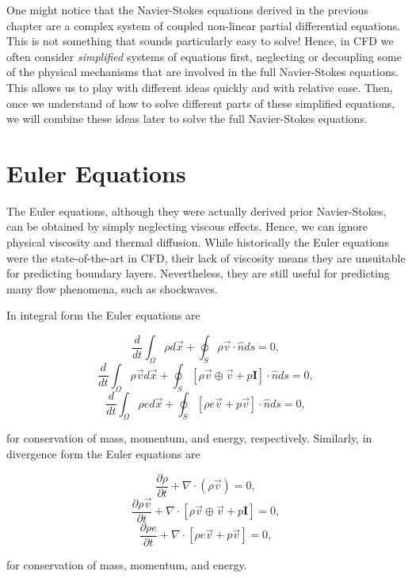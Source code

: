 One might notice that the Navier-Stokes equations derived in the previous chapter are a complex system of coupled non-linear partial differential equations. This is not something that sounds particularly easy to solve! Hence, in CFD we often consider {\it simplified} systems of equations first, neglecting or decoupling some of the physical mechanisms that are involved in the full Navier-Stokes equations. This allows us to play with different ideas quickly and with relative ease. Then, once we understand of how to solve different parts of these simplified equations, we will combine these ideas later to solve the full Navier-Stokes equations. 

\section{Euler Equations}
The Euler equations, although they were actually derived prior Navier-Stokes, can be obtained by simply neglecting viscous effects. Hence, we can ignore physical viscosity and thermal diffusion. While historically the Euler equations were the state-of-the-art in CFD, their lack of viscosity means they are unsuitable for predicting boundary layers. Nevertheless, they are still useful for predicting many flow phenomena, such as shockwaves.

In integral form the Euler equations are
\begin{eqBox}
\begin{equation}
	 \frac{d}{dt}\int_\Omega \rho d\vec{x} + \oint_S \rho \vec{v} \cdot \hat{n} ds = 0,
\end{equation}
\begin{equation}
	\frac{d}{dt}\int_\Omega \rho \vec{v} d\vec{x} + \oint_S \left[ \rho \vec{v} \oplus \vec{v} + p \mathbf{I} \right]\cdot \hat{n} ds =  0,
\end{equation}
\begin{equation}
	\frac{d}{dt}\int_\Omega \rho e d\vec{x} + \oint_S \left[ \rho e \vec{v} + p\vec{v} \right] \cdot \hat{n} ds = 0,
\end{equation}
\end{eqBox}
for conservation of mass, momentum, and energy, respectively. Similarly, in divergence form the Euler equations are
\begin{eqBox}
\begin{equation}
	 \frac{\partial \rho}{\partial t} + \nabla \cdot (\rho \vec{v}) = 0,
\end{equation}
\begin{equation}
	\frac{\partial \rho \vec{v}}{\partial t} + \nabla \cdot \left[ \rho \vec{v} \oplus \vec{v} + p \mathbf{I} \right] =  0,
\end{equation}
\begin{equation}
	\frac{\partial \rho e}{\partial t} + \nabla \cdot \left[ \rho e \vec{v} + p\vec{v} \right] = 0,
\end{equation}
\end{eqBox}
for conservation of mass, momentum, and energy.

